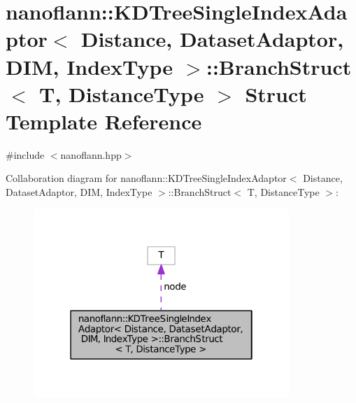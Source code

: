 \hypertarget{structnanoflann_1_1_k_d_tree_single_index_adaptor_1_1_branch_struct}{\section{nanoflann\-:\-:K\-D\-Tree\-Single\-Index\-Adaptor$<$ Distance, Dataset\-Adaptor, D\-I\-M, Index\-Type $>$\-:\-:Branch\-Struct$<$ T, Distance\-Type $>$ Struct Template Reference}
\label{structnanoflann_1_1_k_d_tree_single_index_adaptor_1_1_branch_struct}
}


{\ttfamily \#include $<$nanoflann.\-hpp$>$}



Collaboration diagram for nanoflann\-:\-:K\-D\-Tree\-Single\-Index\-Adaptor$<$ Distance, Dataset\-Adaptor, D\-I\-M, Index\-Type $>$\-:\-:Branch\-Struct$<$ T, Distance\-Type $>$\-:
\nopagebreak
\begin{figure}[H]
\begin{center}
\leavevmode
\includegraphics[width=274pt]{structnanoflann_1_1_k_d_tree_single_index_adaptor_1_1_branch_struct__coll__graph}
\end{center}
\end{figure}
